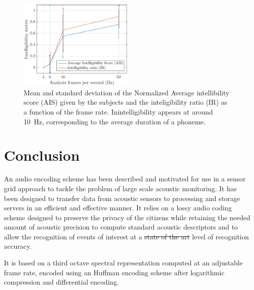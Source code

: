 \documentclass[sensors,article,submit,moreauthors,pdftex,10pt,a4paper]{mdpi}
\providecommand{\DIFaddtex}[1]{{\protect\color{blue}\uwave{#1}}} %
\providecommand{\DIFdeltex}[1]{{\protect\color{red}\sout{#1}}}                      %
\providecommand{\DIFaddbegin}{} %
\providecommand{\DIFaddend}{} %
\providecommand{\DIFdelbegin}{} %
\providecommand{\DIFdelend}{} %
\providecommand{\DIFadd}[1]{\texorpdfstring{\DIFaddtex{#1}}{#1}} %
\providecommand{\DIFdel}[1]{\texorpdfstring{\DIFdeltex{#1}}{}} %
\begin{document}
\begin{figure}[htbp]
	\centering
		\includegraphics[width=0.5\textwidth]{figures/subj_int.eps}
	\caption{Mean and standard deviation of the Normalized Average intellibility score (AIS) given by the subjects and the inteligibility ratio (IR) as a function of the frame rate. Inintelligibility appears at around 10~Hz, corresponding to the average duration of a phoneme.}
	\label{fig:subj_int}
\end{figure}

\section{Conclusion}

An audio encoding scheme has been described and motivated for use in a sensor grid approach to tackle the problem of large scale acoustic monitoring. It has been designed to transfer data from acoustic sensors to processing and storage servers in an efficient and effective manner. It relies on a lossy audio coding scheme designed to preserve the privacy of the citizens while retaining the needed amount of acoustic precision to compute standard acoustic descriptors and to allow the recognition of events of interest at a \DIFdelbegin \DIFdel{state of the art }\DIFdelend \DIFaddbegin \DIFadd{state-of-the-art }\DIFaddend level of recognition accuracy.

It is based on a third octave spectral representation computed at an adjustable frame rate, encoded using an Huffman encoding scheme after logarithmic compression and differential encoding.
\end{document}
